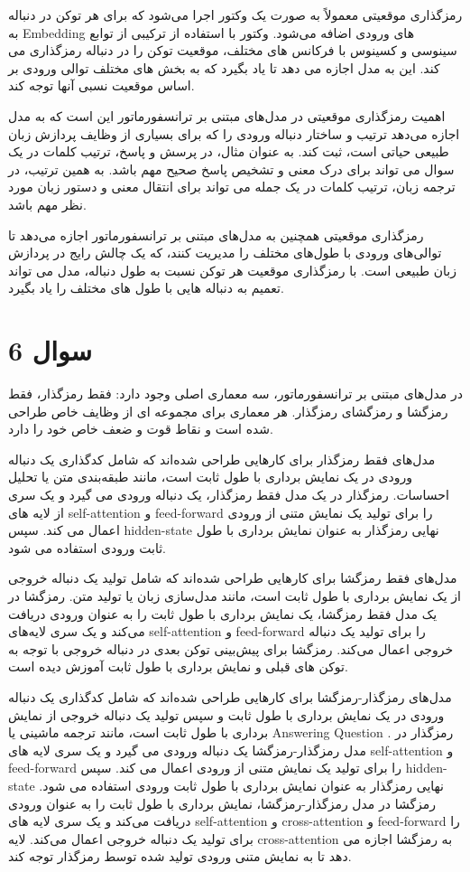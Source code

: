 \documentclass{article}
\begin{document}
رمزگذاری موقعیتی معمولاً به صورت یک وکتور اجرا می‌شود که برای هر توکن در دنباله به Embedding های ورودی اضافه می‌شود. وکتور با استفاده از ترکیبی از توابع سینوسی و کسینوس با فرکانس های مختلف، موقعیت توکن را در دنباله رمزگذاری می کند. این به مدل اجازه می دهد تا یاد بگیرد که به بخش های مختلف توالی ورودی بر اساس موقعیت نسبی آنها توجه کند.

اهمیت رمزگذاری موقعیتی در مدل‌های مبتنی بر ترانسفورماتور این است که به مدل اجازه می‌دهد ترتیب و ساختار دنباله ورودی را که برای بسیاری از وظایف پردازش زبان طبیعی حیاتی است، ثبت کند. به عنوان مثال، در پرسش و پاسخ، ترتیب کلمات در یک سوال می تواند برای درک معنی و تشخیص پاسخ صحیح مهم باشد. به همین ترتیب، در ترجمه زبان، ترتیب کلمات در یک جمله می تواند برای انتقال معنی و دستور زبان مورد نظر مهم باشد.

رمزگذاری موقعیتی همچنین به مدل‌های مبتنی بر ترانسفورماتور اجازه می‌دهد تا توالی‌های ورودی با طول‌های مختلف را مدیریت کنند، که یک چالش رایج در پردازش زبان طبیعی است. با رمزگذاری موقعیت هر توکن نسبت به طول دنباله، مدل می تواند تعمیم به دنباله هایی با طول های مختلف را یاد بگیرد.

\section*{سوال 6}
در مدل‌های مبتنی بر ترانسفورماتور، سه معماری اصلی وجود دارد: فقط رمزگذار، فقط رمزگشا و رمزگشای رمزگذار. هر معماری برای مجموعه ای از وظایف خاص طراحی شده است و نقاط قوت و ضعف خاص خود را دارد.

مدل‌های فقط رمزگذار برای کارهایی طراحی شده‌اند که شامل کدگذاری یک دنباله ورودی در یک نمایش برداری با طول ثابت است، مانند طبقه‌بندی متن یا تحلیل احساسات. رمزگذار در یک مدل فقط رمزگذار، یک دنباله ورودی می گیرد و یک سری از لایه های self-attention و feed-forward را برای تولید یک نمایش متنی از ورودی اعمال می کند. سپس hidden-state نهایی رمزگذار به عنوان نمایش برداری با طول ثابت ورودی استفاده می شود.

مدل‌های فقط رمزگشا برای کارهایی طراحی شده‌اند که شامل تولید یک دنباله خروجی از یک نمایش برداری با طول ثابت است، مانند مدل‌سازی زبان یا تولید متن. رمزگشا در یک مدل فقط رمزگشا، یک نمایش برداری با طول ثابت را به عنوان ورودی دریافت می‌کند و یک سری لایه‌های self-attention و feed-forward را برای تولید یک دنباله خروجی اعمال می‌کند. رمزگشا برای پیش‌بینی توکن بعدی در دنباله خروجی با توجه به توکن های قبلی و نمایش برداری با طول ثابت آموزش دیده است.

مدل‌های رمزگذار-رمزگشا برای کارهایی طراحی شده‌اند که شامل کدگذاری یک دنباله ورودی در یک نمایش برداری با طول ثابت و سپس تولید یک دنباله خروجی از نمایش برداری با طول ثابت است، مانند ترجمه ماشینی یا Answering Question . رمزگذار در مدل رمزگذار-رمزگشا یک دنباله ورودی می گیرد و یک سری لایه های self-attention و feed-forward را برای تولید یک نمایش متنی از ورودی اعمال می کند. سپس hidden-state نهایی رمزگذار به عنوان نمایش برداری با طول ثابت ورودی استفاده می شود. رمزگشا در مدل رمزگذار-رمزگشا، نمایش برداری با طول ثابت را به عنوان ورودی دریافت می‌کند و یک سری لایه های self-attention و cross-attention و feed-forward را برای تولید یک دنباله خروجی اعمال می‌کند. لایه cross-attention به رمزگشا اجازه می دهد تا به نمایش متنی ورودی تولید شده توسط رمزگذار توجه کند.
\end{document}
